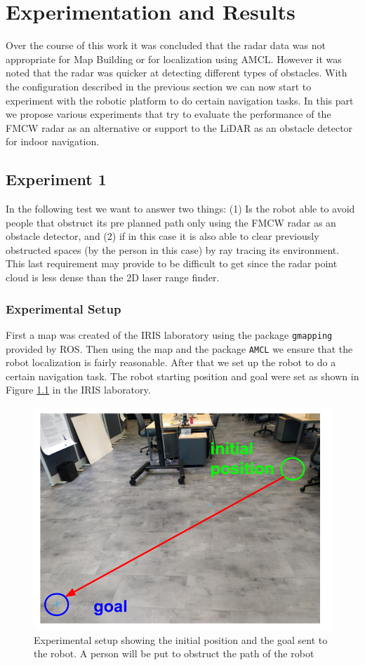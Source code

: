 \chapter{Experimentation and Results}


Over the course of this work it was concluded that the radar data was not appropriate for Map Building or for localization using \ac{AMCL}. However it was noted that the radar was quicker   at detecting different types of obstacles. 
With the configuration described in the previous section we can now start to experiment with the robotic platform to do certain navigation tasks. In this part we propose various experiments that try to evaluate the  performance of the \ac{FMCW} \ac{radar} as an alternative or support to the \ac{LiDAR} as an obstacle detector for indoor navigation.


\section {Experiment 1}
In the following test we want to answer two things: (1) Is the robot able to avoid people that obstruct its pre planned path only using the  \ac{FMCW} radar as an obstacle detector, and (2) if in this case it is also able to clear previously obstructed spaces (by the person in this case) by ray tracing its environment. This last requirement may provide to be difficult to get since the radar point cloud is less dense than the 2D laser range finder.

\subsection{Experimental Setup}
First a map was created of the \ac{IRIS} laboratory using the package \texttt{gmapping} provided by \ac{ROS}. Then using the map and the package \texttt{\ac{AMCL}} we ensure that the robot localization is fairly reasonable. After that we set up the robot to do a certain navigation task.
The robot starting position and goal were set as shown in Figure \ref{fig:setup} in the \ac{IRIS} laboratory. 

\begin{figure}[ht!]
\centerline{\includegraphics [width=0.8 \textwidth]{imgs/chapter5/setup.png}}
\caption{Experimental setup showing the initial position and the goal sent to the robot. A person will be put to obstruct the path of the robot}
\label{fig:setup}
\end{figure}


